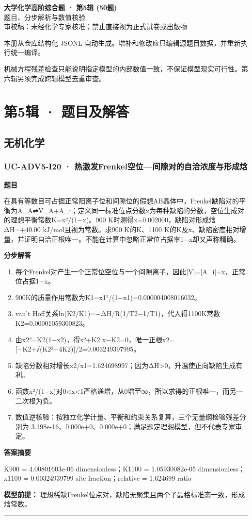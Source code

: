 \documentclass[UTF8,11pt,a4paper]{ctexart}
\begin{document}
\begin{center}
{\LARGE\bfseries 大学化学高阶综合题 · 第5辑 (50题)}\\[0.8em]
{\large 题目、分步解析与数值核验}\\[0.5em]
{\small \textcolor{red!65!black}{审校稿：未经化学专家核准；禁止直接视为正式试卷或出版物}}
\end{center}
\vspace{1em}
\noindent 本册从仓库结构化 JSONL 自动生成。增补和修改应只编辑源题目数据，并重新执行统一编译。
\par 机械方程残差检查只能说明指定模型的内部数值一致，不保证模型现实可行性。第六辑另须完成跨辑模型去重审查。
\tableofcontents
\clearpage
\section*{第5辑 · 题目及解答}
\subsection*{无机化学}
\subsubsection*{UC-ADV5-I20 · 热激发Frenkel空位—间隙对的自洽浓度与形成焓}
\noindent\textbf{题目}\par
在具有等数目可占据正常阳离子位和间隙位的假想AB晶体中，Frenkel缺陷对的平衡为A\_A⇌V\_A+A\_i；定义同一标准位点分数x为每种缺陷的分数，空位生成对的理想平衡常数K=x²/(1−x)。900 K时测得x=0.002000，缺陷对形成焓ΔH=+40.00 kJ/mol且视为常数。求900 K的K、1100 K的K及x、缺陷密度相对增量，并证明自洽正根唯一。不能在计算中忽略正常位占据率1−x却又声称精确。\par
\medskip\noindent\textbf{分步解答}
\begin{enumerate}
\item 每个Frenkel对产生一个正常位空位与一个间隙离子，因此[V]=[A\_i]=x，正常位占据1−x。
\item 900K的质量作用常数为K1=x1²/(1−x1)=0.000004008016032。
\item van’t Hoff关系ln(K2/K1)=−ΔH/R(1/T2−1/T1)，代入得1100K常数K2=0.00001059300823。
\item 由x2²=K2(1−x2)，得x²+K2 x−K2=0，唯一正根x2=[−K2+√(K2²+4K2)]/2=0.003249397995。
\item 缺陷分数相对增长x2/x1=1.624698997；因为ΔH>0，升温使正向缺陷生成有利。
\item 函数x²/(1−x)对0<x<1严格递增，从0增至∞，所以求得的正根唯一，而另一二次根为负。
\item 数值逆核验：按独立化学计量、平衡和约束关系复算，三个无量纲检验残差分别为 3.198e-16、0.000e+0、0.000e+0；满足题定理想模型，但不代表专家审定。
\end{enumerate}
\noindent\textbf{答案摘要}\par
K900 = 4.00801603e-06 dimensionless；K1100 = 1.05930082e-05 dimensionless；x1100 = 0.00324939799 site fraction；relative = 1.624699 ratio\par
\noindent\textbf{模型前提：}
理想稀缺Frenkel位点对，缺陷无聚集且两个子晶格标准态一致，形成焓常数。\par
\medskip\hrule\medskip
{}
\end{document}
